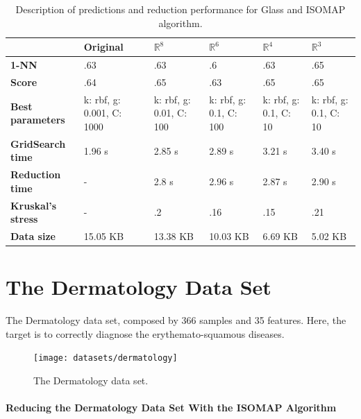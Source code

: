 \begin{table}[H]
	\centering
	
	\begin{tabular}{|p{.15\linewidth}|p{.12\linewidth}|p{.12\linewidth}|p{.12\linewidth}|p{.12\linewidth}|p{.12\linewidth}|}
		\hline
		& \textbf{Original} & $\mathbb{R}^8$ & $\mathbb{R}^6$ & $\mathbb{R}^4$ & $\mathbb{R}^3$ \\\hline
		\textbf{1-NN} & .63 & .63 & .6 & .63 & .65 \\\hline
		\textbf{Score} & .64 & .65 & .63 & .65 & .65 \\\hline
		\textbf{Best parameters} & k: rbf, g: 0.001, C: 1000 & k: rbf, g: 0.01, C: 100 & k: rbf, g: 0.1, C: 100 & k: rbf, g: 0.1, C: 10 & k: rbf, g: 0.1, C: 10\\\hline
		\textbf{GridSearch time} & 1.96 s & 2.85 s & 2.89 s & 3.21 s & 3.40 s \\\hline
		\textbf{Reduction time} & - & 2.8 s & 2.96 s & 2.87 s & 2.90 s \\\hline
		\textbf{Kruskal's stress} & - & .2 & .16 & .15 & .21 \\\hline
		\textbf{Data size} & 15.05 KB & 13.38 KB & 10.03 KB & 6.69 KB & 5.02 KB \\\hline
	\end{tabular}
	\captionsetup{justification=centering}
	\caption{Description of predictions and reduction performance for Glass and ISOMAP algorithm.}
\end{table}

\clearpage
\section{The Dermatology Data Set}

The Dermatology data set, composed by 366 samples and 35 features. Here, the target is to correctly diagnose the erythemato-squamous diseases.
\newline\newline

\begin{figure}[H]
	\centering
	\texttt{[image: datasets/dermatology]}
	\captionsetup{justification=centering}
	\caption{The Dermatology data set.}
\end{figure}

\newpage
\paragraph{Reducing the Dermatology Data Set With the ISOMAP Algorithm}


